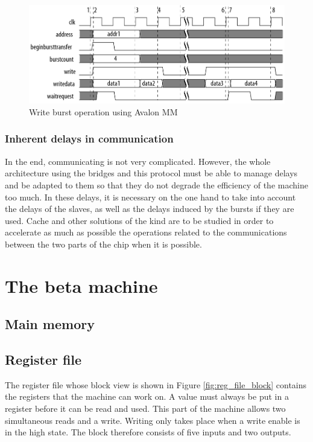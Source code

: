 \documentclass[12pt]{article}
\begin{document}
\begin{figure}[ht!]
  \center
  \includegraphics[width=\linewidth]{"res/board/avalon_mm_write.png"}
  \caption{Write burst operation using Avalon MM}
  \label{fig:avalon_mm_write}
\end{figure}

\subsubsection{Inherent delays in communication}

In the end, communicating is not very complicated. However, the whole architecture using the bridges and this protocol must be able to manage delays and be adapted to them so that they do not degrade the efficiency of the machine too much. In these delays, it is necessary on the one hand to take into account the delays of the slaves, as well as the delays induced by the bursts if they are used. Cache and other solutions of the kind are to be studied in order to accelerate as much as possible the operations related to the communications between the two parts of the chip when it is possible.

\section{The beta machine}

\subsection{Main memory}

\subsection{Register file}

The register file whose block view is shown in Figure \ref{fig:reg_file_block} contains the registers that the machine can work on. A value must always be put in a register before it can be read and used. This part of the machine allows two simultaneous reads and a write. Writing only takes place when a write enable is in the high state. The block therefore consists of five inputs and two outputs.
\end{document}
